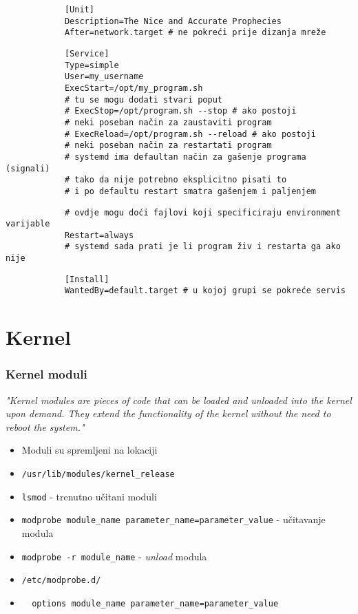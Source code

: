 \documentclass[t]{beamer}
\begin{document}
\begin{frame}[fragile]
	\footnotesize
	\begin{verbatim}
			[Unit]
			Description=The Nice and Accurate Prophecies
			After=network.target # ne pokreći prije dizanja mreže
	\end{verbatim}
	\begin{verbatim}
			[Service]
			Type=simple
			User=my_username		
			ExecStart=/opt/my_program.sh
			# tu se mogu dodati stvari poput
			# ExecStop=/opt/program.sh --stop # ako postoji 
			# neki poseban način za zaustaviti program
			# ExecReload=/opt/program.sh --reload # ako postoji 
			# neki poseban način za restartati program
			# systemd ima defaultan način za gašenje programa (signali) 
			# tako da nije potrebno eksplicitno pisati to
			# i po defaultu restart smatra gašenjem i paljenjem
	\end{verbatim}
	\begin{verbatim}
			# ovdje mogu doći fajlovi koji specificiraju environment varijable
			Restart=always
			# systemd sada prati je li program živ i restarta ga ako nije
	\end{verbatim}
	\begin{verbatim}
			[Install]
			WantedBy=default.target # u kojoj grupi se pokreće servis
	\end{verbatim}
\end{frame}



\section{Kernel}
\begin{frame}[fragile]
	\frametitle{Kernel moduli}
	\textit{"Kernel modules are pieces of code that can be loaded and unloaded into the kernel upon demand. They extend the functionality of the kernel without the need to reboot the system."}
	\begin{itemize}
		\item Moduli su spremljeni na lokaciji
		\item[] \verb|/usr/lib/modules/kernel_release|
	\end{itemize}
	\begin{itemize}
		\item \texttt{lsmod} - trenutno učitani moduli
		\item \texttt{modprobe module\_name parameter\_name=parameter\_value} - učitavanje modula
		\item \texttt{modprobe -r module\_name} - \textit{unload} modula
	\end{itemize}
	\begin{itemize}
		\item[] \verb|/etc/modprobe.d/|
		\item[] \verb|  options module_name parameter_name=parameter_value|
	\end{itemize}
\end{frame}
\end{document}
